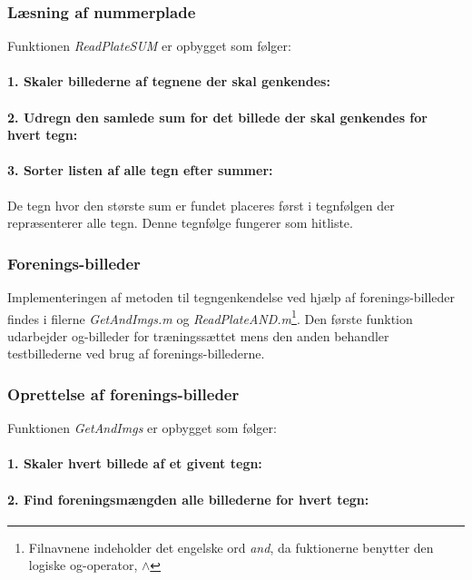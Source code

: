\subsubsection*{Læsning af nummerplade}

Funktionen \textit{ReadPlateSUM} er opbygget som følger:

\paragraph{1. Skaler billederne af tegnene der skal genkendes:}

\paragraph{2. Udregn den samlede sum for det billede der skal genkendes for hvert tegn:}

\paragraph{3. Sorter listen af alle tegn efter summer:} De tegn hvor den største sum er fundet placeres først i tegnfølgen der repræsenterer alle tegn. Denne tegnfølge fungerer som hitliste.

\subsubsection{Forenings-billeder}

Implementeringen af metoden til tegngenkendelse ved hjælp af forenings-billeder findes i filerne \textit{GetAndImgs.m} og \textit{ReadPlateAND.m}\footnote{Filnavnene indeholder det engelske ord \textit{and}, da fuktionerne benytter den logiske og-operator, $\wedge$}. Den første funktion udarbejder og-billeder for træningssættet mens den anden behandler testbillederne ved brug af forenings-billederne.

\subsubsection*{Oprettelse af forenings-billeder}

Funktionen \textit{GetAndImgs} er opbygget som følger:

\paragraph{1. Skaler hvert billede af et givent tegn:}

\paragraph{2. Find foreningsmængden alle billederne for hvert tegn:}

